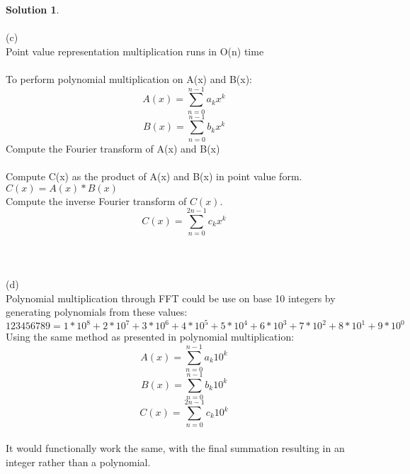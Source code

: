 \documentclass{article}
\theoremstyle{definition}
\newtheorem*{solution}{Solution}
\begin{document}
\begin{solution}
\paragraph{}
(c)\\
Point value representation multiplication runs in O(n) time\\
\\ To perform polynomial multiplication on A(x) and B(x):\\
$$A(x) = \sum_{n=0}^{n-1} a_kx^k$$
$$B(x) = \sum_{n=0}^{n-1} b_kx^k$$
Compute the Fourier transform of A(x) and B(x)\\
\\
Compute C(x) as the product of A(x) and B(x) in point value form.\\
$C(x) = A(x)*B(x)$\\
Compute the inverse Fourier transform of $C(x)$.\\
$$C(x) = \sum_{n=0}^{2n-1} c_kx^k$$\\
\\
\\
(d)\\
Polynomial multiplication through FFT could be use on base 10 integers by generating polynomials from these values:\\
$123456789 = 1*10^8 + 2*10^7 + 3*10^6 + 4*10^5 + 5*10^4 + 6*10^3 + 7*10^2 + 8*10^1 + 9*10^0 $\\
Using the same method as presented in polynomial multiplication:\\
$$A(x) = \sum_{n=0}^{n-1} a_k10^k$$
$$B(x) = \sum_{n=0}^{n-1} b_k10^k$$
$$C(x) = \sum_{n=0}^{2n-1} c_k10^k$$\\
It would functionally work the same, with the final summation resulting in an integer rather than a polynomial.\\

\end{solution}

\newpage 
\end{document}
